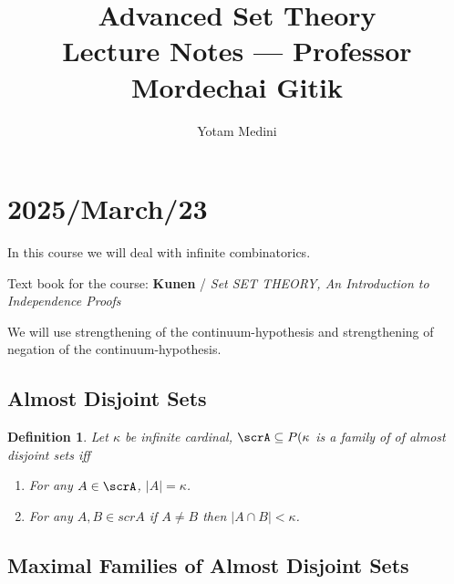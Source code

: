 \documentclass[11pt,pdftex,twoside,a4paper]{article}
\title{Advanced Set Theory
          \\
       Lecture Notes --- Professor Mordechai Gitik}
\author{Yotam Medini}
\newcommand{\B}[1]{\textbf{#1}}
\newtheorem{ldef}[thm]{Definition}
\begin{document}
\maketitle
\newpage
\tableofcontents
\newpage

\section{2025/March/23}

In this course we will deal with infinite combinatorics.

Text book for the course:
  \B{Kunen} / \textit{Set SET THEORY, 
    An Introduction to Independence Proofs}

We will use strengthening of the continuum-hypothesis
and strengthening of negation of the continuum-hypothesis.

\subsection{Almost Disjoint Sets}

\begin{ldef}
Let \(\kappa\) be infinite cardinal, \(\scrA \subseteq P(\kappa\)
is a family of of \emph{almost disjoint sets} iff 
\begin{enumerate}
\item For any \(A\in \scrA\), \(|A|=\kappa\).
\item For any \(A,B \in scrA\) if \(A\neq B\) then \(|A \cap B|<\kappa\).
\end{enumerate}
\end{ldef}

\subsection{Maximal Families of Almost Disjoint Sets}
\end{document}
